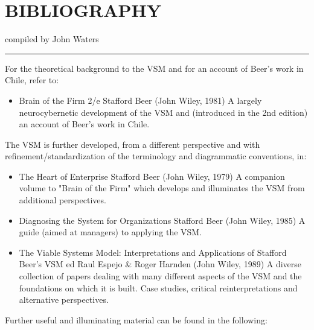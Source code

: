 \chapter*{BIBLIOGRAPHY} \label{BIBLIOGRAPHY}
compiled by John Waters
\hrule
For the theoretical background to the VSM and for an account of Beer's work in Chile, refer to:
\begin{itemize}
	\item Brain of the Firm 2/e
	Stafford Beer (John Wiley, 1981)
	A largely neurocybernetic development of the VSM and (introduced in the 2nd edition) an account of Beer's work in Chile.
\end{itemize}

The VSM is further developed, from a different perspective and with refinement/standardization of the terminology and diagrammatic conventions, in:
\begin{itemize}
	\item The Heart of Enterprise
	Stafford Beer (John Wiley, 1979)
	A companion volume to "Brain of the Firm" which develops and illuminates the VSM from additional perspectives.
	\item Diagnosing the System for Organizations
	Stafford Beer (John Wiley, 1985)
	A guide (aimed at managers) to applying the VSM.
	\item The Viable Systems Model: Interpretations and Applications of Stafford Beer's VSM
	ed Raul Espejo \& Roger Harnden (John Wiley, 1989)
	A diverse collection of papers dealing with many different aspects of the VSM and the foundations on which it is built. Case studies, critical reinterpretations and alternative perspectives.
\end{itemize}
Further useful and illuminating material can be found in the following:
